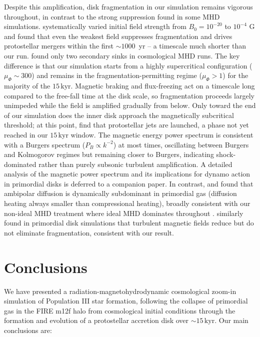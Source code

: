 \documentclass[twocolumn]{openjournal}
\newcommand{\kyr}{\,\mathrm{kyr}}
\begin{document}
Despite this amplification, disk fragmentation in our simulation
remains vigorous throughout, in contrast to the strong suppression
found in some MHD simulations.
\citet{machida25} systematically varied initial field strength from
$B_0 = 10^{-20}$ to $10^{-4}$ G and found that even the weakest
field suppresses fragmentation and drives protostellar mergers within
the first $\sim 1000$~yr -- a timescale much shorter than our run.
\citet{stacy22} found only two secondary sinks in cosmological MHD
runs.
The key difference is that our simulation starts from a highly
supercritical configuration ($\mu_\Phi \sim 300$) and remains in the
fragmentation-permitting regime ($\mu_\Phi > 1$) for the majority of
the $15\kyr$.
Magnetic braking and flux-freezing act on a timescale long compared
to the free-fall time at the disk scale, so fragmentation proceeds
largely unimpeded while the field is amplified gradually from below.
Only toward the end of our simulation does the inner disk approach
the magnetically subcritical threshold; at this point,
\citet{meziani26} find that protostellar jets are launched, a phase
not yet reached in our $15\kyr$ window.
The magnetic energy power spectrum is consistent with a Burgers
spectrum ($P_B \propto k^{-2}$) at most times, oscillating between
Burgers and Kolmogorov regimes but remaining closer to Burgers,
indicating shock-dominated rather than purely subsonic turbulent
amplification.
A detailed analysis of the magnetic power spectrum and its implications
for dynamo action in primordial disks is deferred to a companion paper.
In contrast, \citet{sadanari21} and \citet{sadanari23} found that
ambipolar diffusion is dynamically subdominant in primordial gas
(diffusion heating always smaller than compressional heating), broadly
consistent with our non-ideal MHD treatment where ideal MHD dominates
throughout \citep{meziani26}.
\citet{tanaka24} similarly found in primordial disk simulations that
turbulent magnetic fields reduce but do not eliminate fragmentation,
consistent with our result.



\section{Conclusions}
\label{sec:conclusions}

We have presented a radiation-magnetohydrodynamic cosmological zoom-in
simulation of Population III star formation, following the collapse of
primordial gas in the FIRE m12f halo from cosmological initial
conditions through the formation and evolution of a protostellar
accretion disk over $\sim 15\kyr$.
Our main conclusions are:
\end{document}
